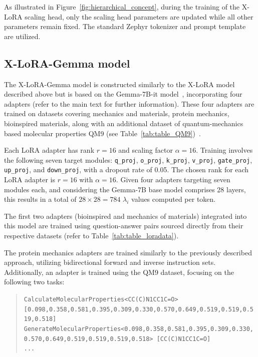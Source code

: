 As illustrated in Figure~\ref{fig:hierarchical_concept}, during the training of the X-LoRA scaling head, only the scaling head parameters are updated while all other parameters remain fixed. The standard Zephyr tokenizer and prompt template are utilized.

\subsection{X-LoRA-Gemma model} The X-LoRA-Gemma model is constructed similarly to the X-LoRA model described above but is based on the Gemma-7B-it model~\cite{Google/gemma-7b-itFace}, incorporating four adapters (refer to the main text for further information). These four adapters are trained on datasets covering mechanics and materials, protein mechanics, bioinspired materials, along with an additional dataset of quantum-mechanics based molecular properties QM9 (see Table~\ref{tab:table_QM9})~\cite{Ruddigkeit2012EnumerationGDB-17,Ramakrishnan2015ElectronicSpace}.

Each LoRA adapter has rank $r=16$ and scaling factor $\alpha=16$. Training involves the following seven target modules: \texttt{q\_proj}, \texttt{o\_proj}, \texttt{k\_proj}, \texttt{v\_proj}, \texttt{gate\_proj}, \texttt{up\_proj}, and \texttt{down\_proj}, with a dropout rate of 0.05. The chosen rank for each LoRA adapter is $r=16$ with $\alpha=16$. Given four adapters targeting seven modules each, and considering the Gemma-7B base model comprises 28 layers, this results in a total of $28\times 28=784$ $\lambda_i$ values computed per token.

The first two adapters (bioinspired and mechanics of materials) integrated into this model are trained using question-answer pairs sourced directly from their respective datasets (refer to Table~\ref{tab:table_loradata}).

The protein mechanics adapters are trained similarly to the previously described approach, utilizing bidirectional forward and inverse instruction sets. Additionally, an adapter is trained using the QM9 dataset, focusing on the following two tasks:

\begin{quote}
\tiny {\texttt{CalculateMolecularProperties<CC(C)N1CC1C=O> [0.098,0.358,0.581,0.395,0.309,0.330,0.570,0.649,0.519,0.519,0.519,0.518]\\
GenerateMolecularProperties<0.098,0.358,0.581,0.395,0.309,0.330,0.570,0.649,0.519,0.519,0.519,0.518> [CC(C)N1CC1C=O]\\ 
...
}}
\end{quote}

